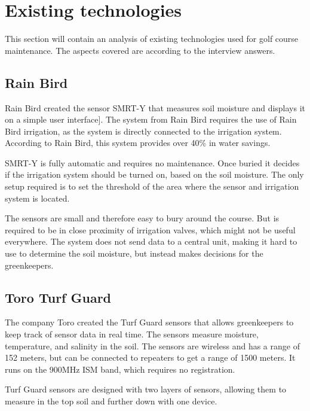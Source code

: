 \section{Existing technologies}
This section will contain an analysis of existing technologies used for golf course maintenance. The aspects covered are according to the interview answers.

\subsection{Rain Bird}
Rain Bird created the sensor SMRT-Y that measures soil moisture and displays it on a simple user interface\cite{smrty}].
The system from Rain Bird requires the use of Rain Bird irrigation, as the system is directly connected to the irrigation system. 
According to Rain Bird, this system provides over 40\% in water savings\cite{smrty2}.

SMRT-Y is fully automatic and requires no maintenance. Once buried it decides if the irrigation system should be turned on, based on the soil moisture. 
The only setup required is to set the threshold of the area where the sensor and irrigation system is located\cite{smrty2}.

The sensors are small and therefore easy to bury around the course. But is required to be in close proximity of irrigation valves, which might not be useful everywhere.
The system does not send data to a central unit, making it hard to use to determine the soil moisture, but instead makes decisions for the greenkeepers. 

\subsection{Toro Turf Guard\texttrademark{}}
The company Toro created the Turf Guard\texttrademark{} sensors that allows greenkeepers to keep track of sensor data in real time. The sensors measure moisture, temperature, and salinity in the soil\cite{turfGuard}.
The sensors are wireless and has a range of 152 meters, but can be connected to repeaters to get a range of 1500 meters\cite{turfGuard}. It runs on the 900MHz ISM band, which requires no registration.

Turf Guard\texttrademark{} sensors are designed with two layers of sensors, allowing them to measure in the top soil and further down with one device.


